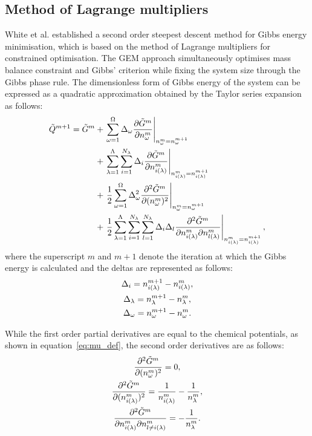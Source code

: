 \subsection{Method of Lagrange multipliers}
White et al. \cite{White:58} established a second order steepest descent method for Gibbs energy minimisation, which is based on the method of Lagrange multipliers for constrained optimisation. The GEM approach simultaneously optimises mass balance constraint and Gibbs' criterion while fixing the system size through the Gibbs phase rule. The dimensionless form of Gibbs energy of the system can be expressed as a quadratic approximation obtained by the Taylor series expansion as follows:
  \begin{equation}\label{eq:GibbsTaylor}
    \begin{split}
      \tilde{Q}^{m+1} = \tilde{G}^{m} &+ \left .\sumstoichphase \Delta_{\omega} \pder{\tilde{G}^m}{\molestoich^m} \right \vert_{\molestoich^m = \molestoich^{m+1}} \\
                      &+ \left . \sumsolnphase \sumspecies \Delta_i \pder{\tilde{G}^m}{\molespecies{i}^m}\right \vert_{\molespecies{i}^m = \molespecies{i}^{m+1}} \\
                      &+ \left . \frac{1}{2} \sumstoichphase \Delta^2_{\omega} \ppder{\tilde{G}^m}{\molestoich^m} \right \vert_{\molestoich^m = \molestoich^{m+1}} \\
                      &+ \left . \frac{1}{2} \sumsolnphase \sumspecies \sumspecies[l] \Delta_i \Delta_l \pqder{\tilde{G}^m}{\molespecies{i}^m}{\molespecies{l}^m} \right \vert_{\molespecies{i}^m = \molespecies{i}^{m+1}},
    \end{split}
  \end{equation}
where the superscript $m$ and $m+1$ denote the iteration at which the Gibbs energy is calculated and the deltas are represented as follows:
  \begin{gather}
      \Delta_i = \molespecies{i}^{m+1} - \molespecies{i}^{m},\\
      \Delta_\lambda = \molesol^{m+1} - \molesol^{m}, \\
      \Delta_\omega = \molestoich^{m+1} - \molestoich^{m}.
  \end{gather}

While the first order partial derivatives are equal to the chemical potentials, as shown in equation~\eqref{eq:mu_def}, the second order derivatives are as follows:
\begin{gather}
  \ppder{\tilde{G}^m}{\molestoich^m} = 0, \label{eq:partial1}\\
  \ppder{\tilde{G}^m}{\molespecies{i}^m} = \frac{1}{\molespecies{i}^m} - \frac{1}{\molesol^m}, \label{eq:partial2} \\
  \pqder{\tilde{G}^m}{\molespecies{i}^m}{\molespecies{l \neq i}^m} = - \frac{1}{\molesol^m}. \label{eq:partial3}
\end{gather}

